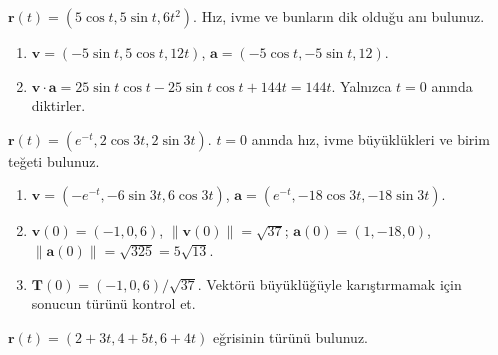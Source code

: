 \begin{tcolorbox}[title={Örnek 3.16 | Tahtadaki hareket örneği},colframe=accent]\(\mathbf r(t)=(5\cos t,5\sin t,6t^2)\). Hız, ivme ve bunların dik olduğu anı bulunuz.
\par{}\end{tcolorbox}
\begin{tcolorbox}[title={Adım adım çözüm},colback=green!3!white,colframe=green]\begin{enumerate}
\item \(\mathbf v=(-5\sin t,5\cos t,12t)\), \(\mathbf a=(-5\cos t,-5\sin t,12)\).
\item \(\mathbf v\cdot\mathbf a=25\sin t\cos t-25\sin t\cos t+144t=144t\). Yalnızca \(t=0\) anında diktirler.
\end{enumerate}\end{tcolorbox}
\begin{tcolorbox}[title={Örnek 3.17 | Üstel ve trigonometrik hareket},colframe=accent]\(\mathbf r(t)=(e^{-t},2\cos3t,2\sin3t)\). \(t=0\) anında hız, ivme büyüklükleri ve birim teğeti bulunuz.
\par{}\end{tcolorbox}
\begin{tcolorbox}[title={Adım adım çözüm},colback=green!3!white,colframe=green]\begin{enumerate}
\item \(\mathbf v=(-e^{-t},-6\sin3t,6\cos3t)\), \(\mathbf a=(e^{-t},-18\cos3t,-18\sin3t)\).
\item \(\mathbf v(0)=(-1,0,6)\), \(\|\mathbf v(0)\|=\sqrt{37}\); \(\mathbf a(0)=(1,-18,0)\), \(\|\mathbf a(0)\|=\sqrt{325}=5\sqrt{13}\).
\item \(\mathbf T(0)=(-1,0,6)/\sqrt{37}\). Vektörü büyüklüğüyle karıştırmamak için sonucun türünü kontrol et.
\end{enumerate}\end{tcolorbox}
\begin{tcolorbox}[title={Örnek 3.18 | Parametrik eğrinin türü},colframe=accent]\(\mathbf r(t)=(2+3t,4+5t,6+4t)\) eğrisinin türünü bulunuz.
\par{}\end{tcolorbox}
